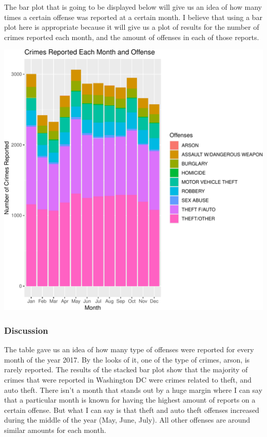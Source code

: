 \documentclass[
]{article}
\begin{document}
The bar plot that is going to be displayed below will give us an idea of
how many times a certain offense was reported at a certain month. I
believe that using a bar plot here is appropriate because it will give
us a plot of results for the number of crimes reported each month, and
the amount of offenses in each of those reports.

\begin{center}\includegraphics{./figures/appendix-plot-bar-graph-1} \end{center}

\subsubsection{Discussion}\label{discussion}

The table gave us an idea of how many type of offenses were reported for
every month of the year 2017. By the looks of it, one of the type of
crimes, arson, is rarely reported. The results of the stacked bar plot
show that the majority of crimes that were reported in Washington DC
were crimes related to theft, and auto theft. There isn't a month that
stands out by a huge margin where I can say that a particular month is
known for having the highest amount of reports on a certain offense. But
what I can say is that theft and auto theft offenses increased during
the middle of the year (May, June, July). All other offenses are around
similar amounts for each month.
\end{document}
